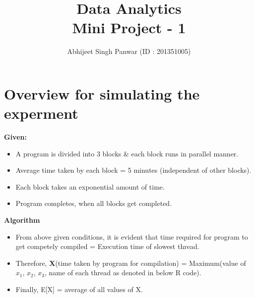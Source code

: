 \documentclass[12pt,a4paper]{report}
\author{Abhijeet Singh Panwar (ID : 201351005)}
\title{Data Analytics\\ Mini Project - 1}
\date{\parbox{\linewidth}{\centering%
  \today\endgraf\bigskip
  Instructor : \endgraf\medskip
  Prof. Bhargab Chattopadhyay\endgraf\bigskip
  Indian Institute of Information Technology, Vadodara}}
\begin{document}
\maketitle
\newpage
\section{Overview for simulating the experment}
\textbf{Given:}\\
\begin{itemize}
\item A program is divided into 3 blocks \& each block runs in parallel manner.
\item Average time taken by each block = 5 minutes (independent of other blocks).
\item Each block takes an exponential amount of time.
\item Program completes, when all blocks get completed.
\end{itemize}

\textbf{Algorithm}
\begin{itemize}
\item From above given conditions, it is evident that time required for program to get competely compiled = Execution time of slowest thread.
\item Therefore, \textbf{X}(time taken by program for compilation) = Maximum(value of $x_1$, $x_2$, $x_3$, name of each thread as denoted in below R code).
\item Finally, E[X] = average of all values of X.
\end{itemize}
\end{document}
